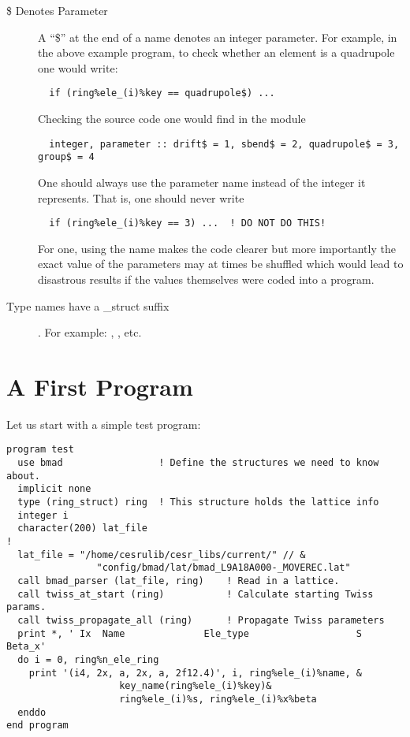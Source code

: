 \begin{description}
\item[\$ Denotes Parameter] A ``\$'' at the end of a name denotes an 
integer parameter. For example, in the above example program, to check
whether an element is a quadrupole one would write:
\begin{verbatim}
  if (ring%ele_(i)%key == quadrupole$) ...
\end{verbatim}
Checking the source code one would find in the module 
\begin{verbatim}
  integer, parameter :: drift$ = 1, sbend$ = 2, quadrupole$ = 3, group$ = 4
\end{verbatim}
One should always use the parameter name instead of the integer it represents.
That is, one should never write
\begin{verbatim}
  if (ring%ele_(i)%key == 3) ...  ! DO NOT DO THIS!
\end{verbatim}
For one, using the name makes the code clearer but more importantly
the exact value of the parameters may at times be shuffled which would
lead to disastrous results if the values themselves were coded into a
program.

\item[ Type names have a \_struct suffix]. For example: , 
, etc.

\end{description}

\section{A First Program}

Let us start with a simple test program:
\begin{verbatim}
program test
  use bmad                 ! Define the structures we need to know about.
  implicit none
  type (ring_struct) ring  ! This structure holds the lattice info
  integer i
  character(200) lat_file
!
  lat_file = "/home/cesrulib/cesr_libs/current/" // &
                "config/bmad/lat/bmad_L9A18A000-_MOVEREC.lat"
  call bmad_parser (lat_file, ring)    ! Read in a lattice.
  call twiss_at_start (ring)           ! Calculate starting Twiss params.
  call twiss_propagate_all (ring)      ! Propagate Twiss parameters
  print *, ' Ix  Name              Ele_type                   S      Beta_x'
  do i = 0, ring%n_ele_ring
    print '(i4, 2x, a, 2x, a, 2f12.4)', i, ring%ele_(i)%name, &
                    key_name(ring%ele_(i)%key)&
                    ring%ele_(i)%s, ring%ele_(i)%x%beta
  enddo
end program
\end{verbatim}

